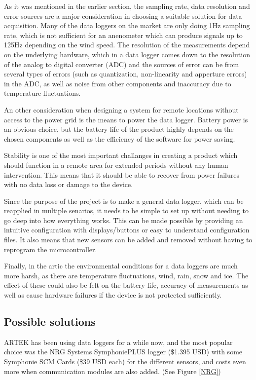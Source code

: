 \documentclass{project}
\begin{document}
As it was mentioned in the earlier section, the sampling rate, data resolution and error sources are a major consideration in choosing a suitable solution for data acquisition. Many of the data loggers on the market are only doing 1Hz sampling rate, which is not sufficient for an anenometer which can produce signals up to 125Hz depending on the wind speed. The resolution of the measurements depend on the underlying hardware, which in a data logger comes down to the resolution of the analog to digital converter (ADC) and the sources of error can be from several types of errors (such as quantization, non-linearity and apperture errors) in the ADC, as well as noise from other components and inaccuracy due to temperature fluctuations.

An other consideration when designing a system for remote locations without access to the power grid is the means to power the data logger. Battery power is an obvious choice, but the battery life of the product highly depends on the chosen components as well as the efficiency of the software for power saving. 

Stability is one of the most important challanges in creating a product which should function in a remote area for extended periods without any human intervention. This means that it should be able to recover from power failures with no data loss or damage to the device.

Since the purpose of the project is to make a general data logger, which can be reapplied in multiple senarios, it needs to be simple to set up without needing to go deep into how everything works. This can be made possible by providing an intuitive configuration with displays/buttons or easy to understand configuration files. It also means that new sensors can be added and removed without having to reprogram the microcontroller.

Finally, in the artic the environmental conditions for a data loggers are much more harsh, as there are temperature fluctuations, wind, rain, snow and ice. The effect of these could also be felt on the battery life, accuracy of measurements as well as cause hardware failures if the device is not protected sufficiently.

\subsection{Possible solutions}
ARTEK has been using data loggers for a while now, and the most popular choice was the NRG Systems SymphoniePLUS logger (\$1.395 USD) with some Symphonie SCM Cards (\$39 USD each) for the different sensors, and costs even more when communication modules are also added. (See Figure \ref{NRG})
 
\end{document}
